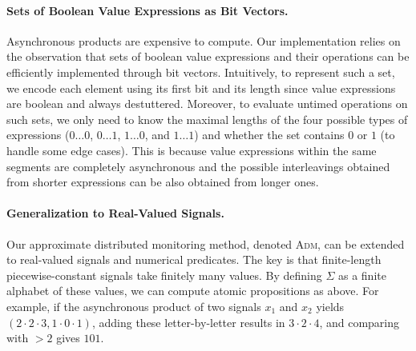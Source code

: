 \paragraph*{Sets of Boolean Value Expressions as Bit Vectors.}
Asynchronous products are expensive to compute.
Our implementation relies on the observation that sets of boolean value expressions and their operations can be efficiently implemented through bit vectors.
Intuitively, to represent such a set, we encode each element using its first bit and its length since value expressions are boolean and always destuttered.
Moreover, to evaluate untimed operations on such sets, we only need to know the maximal lengths of the four possible types of expressions ($0 \ldots 0$, $0 \ldots 1$, $1 \ldots 0$, and $1 \ldots 1$) and whether the set contains $0$ or $1$ (to handle some edge cases).
This is because value expressions within the same segments are completely asynchronous and the possible interleavings obtained from shorter expressions can be also obtained from longer ones.

\paragraph*{Generalization to Real-Valued Signals.}
Our approximate distributed monitoring method, denoted \textsc{Adm}, can be extended to real-valued signals and numerical predicates.
The key is that finite-length piecewise-constant signals take finitely many values.
By defining $\Sigma$ as a finite alphabet of these values, we can compute atomic propositions as above.
For example, if the asynchronous product of two signals $x_1$ and $x_2$ yields $(2\cdot2\cdot3, 1\cdot0\cdot1)$, adding these letter-by-letter results in $3 \cdot 2 \cdot 4$, and comparing with $> 2$ gives $101$.

